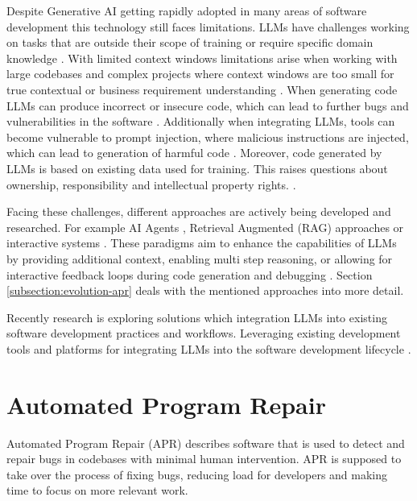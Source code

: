 Despite Generative AI getting rapidly adopted in many areas of software development this technology still faces limitations. LLMs have challenges working on tasks that are outside their scope of training or require specific domain knowledge \cite{houLargeLanguageModels2024}. With limited context windows limitations arise when working with large codebases and complex projects where context windows are too small for true contextual or business requirement understanding \cite{bhargavmallampatiRoleGenerativeAI2025}. When generating code LLMs can produce incorrect or insecure code, which can lead to further bugs and vulnerabilities in the software \cite{houLargeLanguageModels2024, bhargavmallampatiRoleGenerativeAI2025}. Additionally when integrating LLMs, tools can become vulnerable to prompt injection, where malicious instructions are injected, which can lead to generation of harmful code \cite{liuPromptInjectionAttack2024}. Moreover, code generated by LLMs is based on existing data used for training. This raises questions about ownership, responsibility and intellectual property rights. \cite{sauvolaFutureSoftwareDevelopment2024, houLargeLanguageModels2024}.

Facing these challenges, different approaches are actively being developed and researched. For example AI Agents \cite{liuMarsCodeAgentAInative2024,yangSWEagentAgentComputerInterfaces2024}, Retrieval Augmented (RAG) approaches \cite{xiaAgentlessDemystifyingLLMbased2024} or interactive systems \cite{xiaAutomatedProgramRepair2024}. These paradigms aim to enhance the capabilities of LLMs by providing additional context, enabling multi step reasoning, or allowing for interactive feedback loops during code generation and debugging \cite{houLargeLanguageModels2024, puvvadiCodingAgentsComprehensive2025}. Section \ref{subsection:evolution-apr} deals with the mentioned approaches into more detail.

Recently research is exploring solutions which integration LLMs into existing software development practices and workflows. Leveraging existing development tools and platforms for integrating LLMs into the software development lifecycle \cite{puvvadiCodingAgentsComprehensive2025, dohmkeGitHubCopilotMeet2025, IntroducingCodex, sauvolaFutureSoftwareDevelopment2024}.

\section{Automated Program Repair}

Automated Program Repair (APR) describes software that is used to detect and repair bugs in codebases with minimal human intervention. \cite{zhangSurveyLearningbasedAutomated2024} APR is supposed to take over the process of fixing bugs, reducing load for developers and making time to focus on more relevant work. \cite{houLargeLanguageModels2024}

